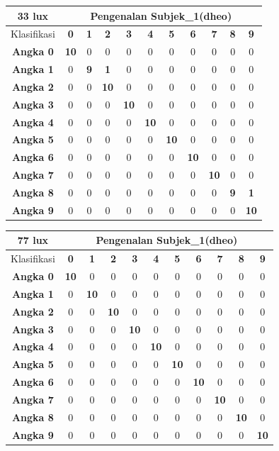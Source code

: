 \begin{tabular}{|c|c|c|c|c|c|c|c|c|c|c|}
	\hline 33 lux
	& \multicolumn{10}{|c|}{Pengenalan Subjek\_1(dheo)} \\
	\hline  Klasifikasi&\textbf{0} &\textbf{1} &\textbf{2} &\textbf{3} &\textbf{4}&\textbf{5} &\textbf{6}&\textbf{7}&\textbf{8}&\textbf{9}\\
	\hline \textbf{Angka 0} &\textbf{10} &0 &0 &0 &0 &0 &0 &0 &0 &0\\
	\hline \textbf{Angka 1} &0 &\textbf{9} &\textbf{1} &0 &0 &0 &0 &0 &0 &0\\
	\hline \textbf{Angka 2} &0 &0 &\textbf{10} &0 &0 &0 &0 &0 &0 &0\\
	\hline \textbf{Angka 3} &0 &0 &0 &\textbf{10} &0 &0 &0 &0 &0 &0\\
	\hline \textbf{Angka 4} &0 &0 &0 &0 &\textbf{10} &0 &0 &0 &0 &0\\
	\hline \textbf{Angka 5} &0 &0 &0 &0 &0 &\textbf{10} &0 &0 &0 &0\\
	\hline \textbf{Angka 6} &0 &0 &0 &0 &0 &0 &\textbf{10} &0 &0 &0\\
	\hline \textbf{Angka 7} &0 &0 &0 &0 &0 &0 &0 &\textbf{10} &0 &0\\
	\hline \textbf{Angka 8} &0 &0 &0 &0 &0 &0 &0 &0 &\textbf{9} &\textbf{1} \\
	\hline \textbf{Angka 9} &0 &0 &0 &0 &0 &0 &0 &0 &0 &\textbf{10} \\
	\hline
\end{tabular}

\begin{tabular}{|c|c|c|c|c|c|c|c|c|c|c|}
	\hline 77 lux
	& \multicolumn{10}{|c|}{Pengenalan Subjek\_1(dheo)} \\
	\hline  Klasifikasi&\textbf{0} &\textbf{1} &\textbf{2} &\textbf{3} &\textbf{4}&\textbf{5} &\textbf{6}&\textbf{7}&\textbf{8}&\textbf{9}\\
	\hline \textbf{Angka 0} &\textbf{10} &0 &0 &0 &0 &0 &0 &0 &0 &0\\
	\hline \textbf{Angka 1} &0 &\textbf{10} &0 &0 &0 &0 &0 &0 &0 &0\\
	\hline \textbf{Angka 2} &0 &0 &\textbf{10} &0 &0 &0 &0 &0 &0 &0\\
	\hline \textbf{Angka 3} &0 &0 &0 &\textbf{10} &0 &0 &0 &0 &0 &0\\
	\hline \textbf{Angka 4} &0 &0 &0 &0 &\textbf{10} &0 &0 &0 &0 &0\\
	\hline \textbf{Angka 5} &0 &0 &0 &0 &0 &\textbf{10} &0 &0 &0 &0\\
	\hline \textbf{Angka 6} &0 &0 &0 &0 &0 &0 &\textbf{10} &0 &0 &0\\
	\hline \textbf{Angka 7} &0 &0 &0 &0 &0 &0 &0 &\textbf{10} &0 &0\\
	\hline \textbf{Angka 8} &0 &0 &0 &0 &0 &0 &0 &0 &\textbf{10} &0 \\
	\hline \textbf{Angka 9} &0 &0 &0 &0 &0 &0 &0 &0 &0 &\textbf{10} \\
	\hline
\end{tabular}

